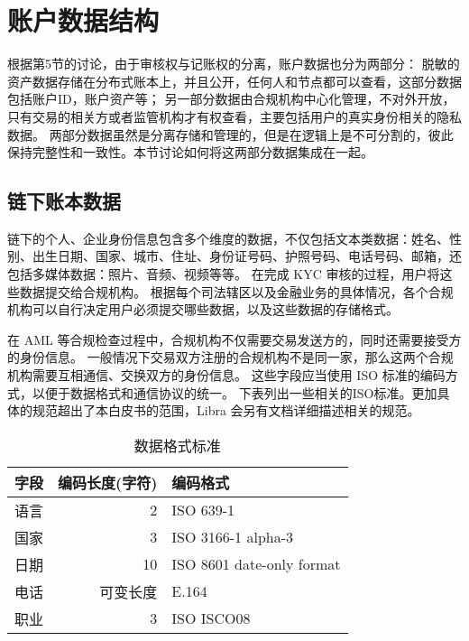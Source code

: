 \section{账户数据结构}\label{sec:account_structure}

根据第5节的讨论，由于审核权与记账权的分离，账户数据也分为两部分：
脱敏的资产数据存储在分布式账本上，并且公开，任何人和节点都可以查看，这部分数据包括账户ID，账户资产等；
另一部分数据由合规机构中心化管理，不对外开放，只有交易的相关方或者监管机构才有权查看，主要包括用户的真实身份相关的隐私数据。
两部分数据虽然是分离存储和管理的，但是在逻辑上是不可分割的，彼此保持完整性和一致性。本节讨论如何将这两部分数据集成在一起。

\subsection{链下账本数据}
链下的个人、企业身份信息包含多个维度的数据，不仅包括文本类数据：姓名、性别、出生日期、国家、城市、住址、身份证号码、护照号码、电话号码、邮箱，还包括多媒体数据：照片、音频、视频等等。
在完成 KYC 审核的过程，用户将这些数据提交给合规机构。
根据每个司法辖区以及金融业务的具体情况，各个合规机构可以自行决定用户必须提交哪些数据，以及这些数据的存储格式。

在 AML 等合规检查过程中，合规机构不仅需要交易发送方的，同时还需要接受方的身份信息。
一般情况下交易双方注册的合规机构不是同一家，那么这两个合规机构需要互相通信、交换双方的身份信息。
这些字段应当使用 ISO 标准的编码方式，以便于数据格式和通信协议的统一。
下表列出一些相关的ISO标准。更加具体的规范超出了本白皮书的范围，Libra 会另有文档详细描述相关的规范。

\begin{table}[h!]
    \caption{数据格式标准} 
    \label{tab:data_format}
    \small %
    \centering %
    \begin{tabular}{lrl} %
        \toprule[\heavyrulewidth]\toprule[\heavyrulewidth]
        \textbf{字段} & \textbf{编码长度(字符)} & \textbf{编码格式} \\ 
        \hline
        语言 & 2 & ISO 639-1 \\
        \hline
        国家 & 3 & ISO 3166-1 alpha-3 \\
        \hline
        日期 & 10 & ISO 8601 date-only format \\
        \hline
        电话 & 可变长度 & E.164 \\
        \hline
        职业 & 3 & ISO ISCO08 \\
        \bottomrule[\heavyrulewidth] 
    \end{tabular}
\end{table}


